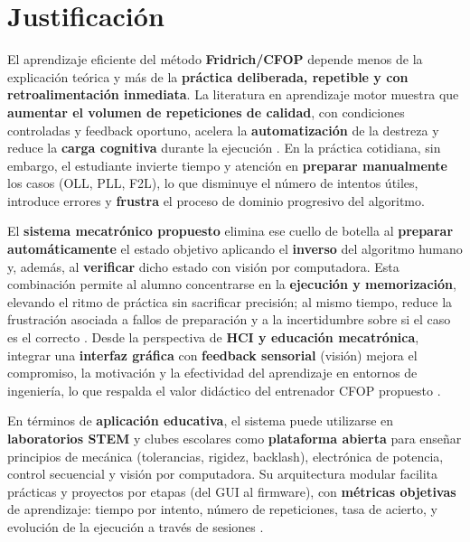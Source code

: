 
\section{Justificación}

El aprendizaje eficiente del método \textbf{Fridrich/CFOP} depende menos de la explicación teórica y más de la \textbf{práctica deliberada, repetible y con retroalimentación inmediata}. 
La literatura en aprendizaje motor muestra que \textbf{aumentar el volumen de repeticiones de calidad}, con condiciones controladas y feedback oportuno, acelera la \textbf{automatización} de la destreza y reduce la \textbf{carga cognitiva} durante la ejecución \cite{haith2019shape,oppici2021deliberate,du2022relationship}. 
En la práctica cotidiana, sin embargo, el estudiante invierte tiempo y atención en \textbf{preparar manualmente} los casos (OLL, PLL, F2L), lo que disminuye el número de intentos útiles, introduce errores y \textbf{frustra} el proceso de dominio progresivo del algoritmo.

El \textbf{sistema mecatrónico propuesto} elimina ese cuello de botella al \textbf{preparar automáticamente} el estado objetivo aplicando el \textbf{inverso} del algoritmo humano y, además, al \textbf{verificar} dicho estado con visión por computadora. 
Esta combinación permite al alumno concentrarse en la \textbf{ejecución y memorización}, elevando el ritmo de práctica sin sacrificar precisión; al mismo tiempo, reduce la frustración asociada a fallos de preparación y a la incertidumbre sobre si el caso es el correcto \cite{khan2020opencv,appapogu2016rubik,hack2015rubik}. 
Desde la perspectiva de \textbf{HCI y educación mecatrónica}, integrar una \textbf{interfaz gráfica} con \textbf{feedback sensorial} (visión) mejora el compromiso, la motivación y la efectividad del aprendizaje en entornos de ingeniería, lo que respalda el valor didáctico del entrenador CFOP propuesto \cite{guerrero2023educational,aljuboori2022application}.

En términos de \textbf{aplicación educativa}, el sistema puede utilizarse en \textbf{laboratorios STEM} y clubes escolares como \textbf{plataforma abierta} para enseñar principios de mecánica (tolerancias, rigidez, backlash), electrónica de potencia, control secuencial y visión por computadora. 
Su arquitectura modular facilita prácticas y proyectos por etapas (del GUI al firmware), con \textbf{métricas objetivas} de aprendizaje: tiempo por intento, número de repeticiones, tasa de acierto, y evolución de la ejecución a través de sesiones \cite{guerrero2023educational,aljuboori2022application,budynas2011shigley,shigley2004handbook}.

